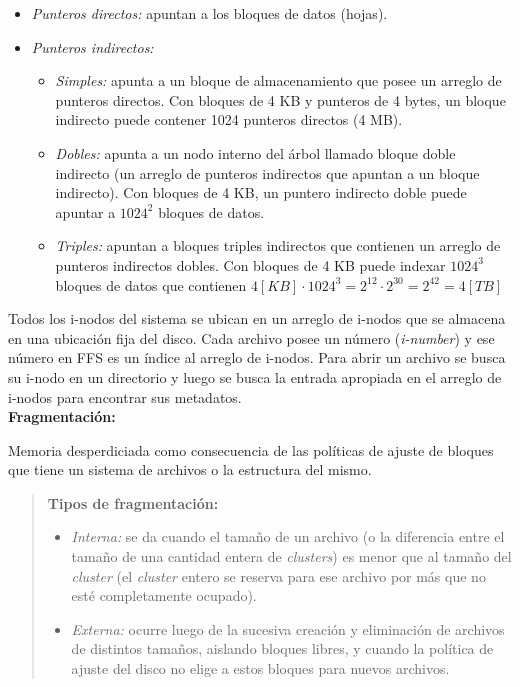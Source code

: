 \documentclass[a4paper,10pt,spanish]{article}
\begin{document}
\begin{itemize}
\item \textit{Punteros directos:} apuntan a los bloques de datos (hojas).

\item \textit{Punteros indirectos:}

	\begin{itemize}
	\item \textit{Simples:} apunta a un bloque de almacenamiento que posee un arreglo 		de punteros directos. Con bloques de 4 KB y punteros de 4 bytes, un bloque 				indirecto puede contener 1024 punteros directos (4 MB).
	
	\item \textit{Dobles:} apunta a un nodo interno del árbol llamado bloque doble 			indirecto (un arreglo de punteros indirectos que apuntan a un bloque indirecto). 		Con bloques de 4 KB, un puntero indirecto doble puede apuntar a $1024^{2}$ bloques 	de datos.
	
	\item \textit{Triples:} apuntan a bloques triples indirectos que contienen un 			arreglo de punteros indirectos dobles. Con bloques de 4 KB puede indexar $1024^{3}		$ bloques de datos que contienen $4[KB]\cdot 1024^{3}=2^{12}\cdot 2^{30}=2^{42}			=4[TB]$
	\end{itemize}

\end{itemize}

Todos los i-nodos del sistema se ubican en un arreglo de i-nodos que se almacena en una ubicación fija del disco. Cada archivo posee un número (\textit{i-number}) y ese número en FFS es un índice al arreglo de i-nodos. Para abrir un archivo se busca su i-nodo en un directorio y luego se busca la entrada apropiada en el arreglo de i-nodos para encontrar sus metadatos. \\

\textbf{Fragmentación:}

Memoria desperdiciada como consecuencia de las políticas de ajuste de bloques que tiene un sistema de archivos o la estructura del mismo.

\begin{quote}

\textbf{Tipos de fragmentación:}
\begin{itemize}
\item \textit{Interna:} se da cuando el tamaño de un archivo (o la diferencia entre el tamaño de una cantidad entera de \textit{clusters}) es menor que al tamaño del \textit{cluster} (el \textit{cluster} entero se reserva para ese archivo por más que no esté completamente ocupado).

\item \textit{Externa:} ocurre luego de la sucesiva creación y eliminación de archivos de distintos tamaños, aislando bloques libres, y cuando la política de ajuste del disco no elige a estos bloques para nuevos archivos.
\end{itemize}

\end{quote}
\end{document}
